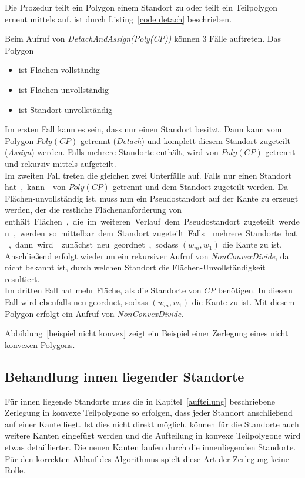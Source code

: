 \documentclass[ngerman]{seminarbeitrag}
\begin{document}
Die Prozedur \daa teilt ein Polygon einem Standort zu oder teilt ein Teilpolygon erneut mittels \noncon auf. \daa ist durch Listing~\ref{code detach} beschrieben.

Beim Aufruf von \emph{DetachAndAssign(Poly(CP))} können 3 Fälle auftreten. Das Polygon
\begin{itemize}
\item {} ist Flächen-vollständig
\item {} ist Flächen-unvollständig
\item {} ist Standort-unvollständig
\end{itemize}
Im ersten Fall kann es sein, dass  nur einen Standort besitzt. Dann kann  vom Polygon $Poly(CP)$ getrennt (\emph{Detach}) und komplett diesem Standort zugeteilt (\emph{Assign}) werden.
Falls mehrere Standorte enthält, wird von $Poly(CP)$ getrennt und rekursiv mittels \noncon aufgeteilt. \\
Im zweiten Fall treten die gleichen zwei Unterfälle auf. Falls nur einen Standort \si hat, kann von $Poly(CP)$ getrennt und dem Standort zugeteilt werden. Da Flächen-unvollständig ist, muss nun ein Pseudostandort auf der Kante zu erzeugt werden, der die restliche Flächenanforderung von \si enthält. Flächen, die im weiteren Verlauf dem Pseudostandort zugeteilt werden, werden so mittelbar dem Standort \si zugeteilt.
Falls mehrere Standorte hat, dann wird zunächst neu geordnet, sodass $(w_{m}, w_{1})$ die Kante zu ist. Anschließend erfolgt wiederum ein rekursiver Aufruf von \mbox{\textit{NonConvexDivide}}, da nicht bekannt ist, durch welchen Standort die Flächen-Unvollständigkeit resultiert.\\
Im dritten Fall hat mehr Fläche, als die Standorte von $CP$ benötigen. In diesem Fall wird ebenfalls neu geordnet, sodass $(w_{m}, w_{1})$ die Kante zu  ist. Mit diesem Polygon erfolgt ein Aufruf von \mbox{\textit{NonConvexDivide}}.

Abbildung~\ref{beispiel nicht konvex} zeigt ein Beispiel einer Zerlegung eines nicht konvexen Polygons.

\subsection{Behandlung innen liegender Standorte}\label{innere Standorte}
Für innen liegende Standorte muss die in Kapitel~\ref{aufteilung} beschriebene Zerlegung in konvexe Teilpolygone so erfolgen, dass jeder Standort anschließend auf einer Kante liegt. Ist dies nicht direkt möglich, können für die Standorte auch weitere Kanten eingefügt werden und die Aufteilung in konvexe Teilpolygone wird etwas detaillierter. Die neuen Kanten laufen durch die innenliegenden Standorte. Für den korrekten Ablauf des Algorithmus spielt diese Art der Zerlegung keine Rolle.
\end{document}

